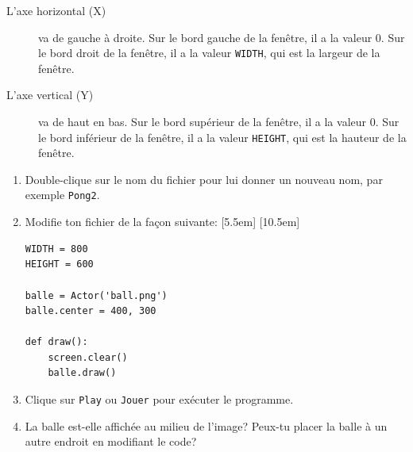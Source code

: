 \documentclass[11pt]{article}
\newcommand{\trad}[1]{\marginnote{\textcolor{deepblue}{#1}}}
\begin{document}
\begin{center}
\end{center}

\begin{description}
    \item[L'axe horizontal (X)] va de gauche à droite.
    Sur le bord gauche de la fenêtre, il a la valeur 0.
    Sur le bord droit de la fenêtre, il a la valeur \lstinline{WIDTH},
    qui est la largeur de la fenêtre.
    
    \item[L'axe vertical (Y)] va de haut en bas.
    Sur le bord supérieur de la fenêtre, il a la valeur 0.
    Sur le bord inférieur de la fenêtre, il a la valeur \lstinline{HEIGHT},
    qui est la hauteur de la fenêtre.
\end{description}

\begin{enumerate}
    \item Double-clique sur le nom du fichier pour lui donner un nouveau nom, par exemple \texttt{Pong2}.

    \item Modifie ton fichier de la façon suivante:
    \marginnote{\textcolor{deepblue}{Actor~=~acteur\\center~=~centre}}[5.5em]
    \marginnote{\textcolor{deepblue}{clear~=~effacer}}[10.5em]
\begin{lstlisting}
WIDTH = 800
HEIGHT = 600

balle = Actor('ball.png')
balle.center = 400, 300

def draw():
    screen.clear()
    balle.draw()
\end{lstlisting}

    \item Clique sur \texttt{Play} ou \texttt{Jouer} pour exécuter le programme.

    \item La balle est-elle affichée au milieu de l'image?
    Peux-tu placer la balle à un autre endroit en modifiant le code?
\end{enumerate}
\end{document}
